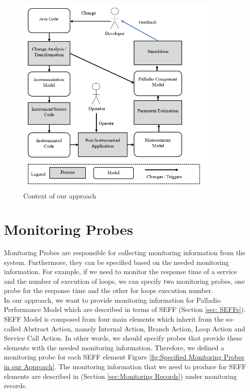 \begin{figure}[h]
\centering
\includegraphics[width=0.9\textwidth]{figures/approach_context}
\caption{Context of our approach}
\label{fig:Context of our approach}
\end{figure}


\section{Monitoring Probes}
\label{sec:Monitoring Probes}
Monitoring Probes are responsible for collecting monitoring information from the system. Furthermore, they can be specified based on the needed monitoring information. For example, if we need to monitor the response time of a service and the number of execution of loops, we can specify two monitoring probes, one probe for the response time and the other for loops execution number. \\

In our approach, we want to provide monitoring information for Palladio Performance Model which are described in terms of SEFF (Section \ref{sec: SEFFs}).   SEFF Model is composed from four main elements which inherit from the so-called Abstract Action, namely Internal Action, Branch Action, Loop Action and Service Call Action. In other words, we should specify probes that provide these elements with the needed monitoring information. Therefore, we defined a monitoring probe for each SEFF element Figure \ref{fig:Specified Monitoring Probes in our Approach}. The monitoring information that we need to produce for SEFF elements are described in (Section \ref{sec:Monitoring Records}) under monitoring records.  \\

